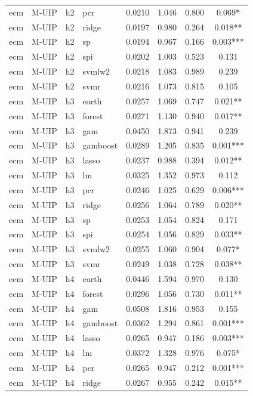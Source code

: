 \begin{ThreePartTable}
\begin{longtable}[t]{llclcccc}
ecm & M-UIP & h2 & pcr & 0.0210 & 1.046 & 0.800 & 0.069*\\
ecm & M-UIP & h2 & ridge & 0.0197 & 0.980 & 0.264 & 0.018**\\
ecm & M-UIP & h2 & sp & 0.0194 & 0.967 & 0.166 & 0.003***\\
ecm & M-UIP & h2 & spi & 0.0202 & 1.003 & 0.523 & 0.131\\
ecm & M-UIP & h2 & svmlw2 & 0.0218 & 1.083 & 0.989 & 0.239\\
ecm & M-UIP & h2 & svmr & 0.0216 & 1.073 & 0.815 & 0.105\\
\addlinespace
ecm & M-UIP & h3 & earth & 0.0257 & 1.069 & 0.747 & 0.021**\\
ecm & M-UIP & h3 & forest & 0.0271 & 1.130 & 0.940 & 0.017**\\
ecm & M-UIP & h3 & gam & 0.0450 & 1.873 & 0.941 & 0.239\\
ecm & M-UIP & h3 & gamboost & 0.0289 & 1.205 & 0.835 & 0.001***\\
ecm & M-UIP & h3 & lasso & 0.0237 & 0.988 & 0.394 & 0.012**\\
ecm & M-UIP & h3 & lm & 0.0325 & 1.352 & 0.973 & 0.112\\
ecm & M-UIP & h3 & pcr & 0.0246 & 1.025 & 0.629 & 0.006***\\
ecm & M-UIP & h3 & ridge & 0.0256 & 1.064 & 0.789 & 0.020**\\
ecm & M-UIP & h3 & sp & 0.0253 & 1.054 & 0.824 & 0.171\\
ecm & M-UIP & h3 & spi & 0.0254 & 1.056 & 0.829 & 0.033**\\
ecm & M-UIP & h3 & svmlw2 & 0.0255 & 1.060 & 0.904 & 0.077*\\
ecm & M-UIP & h3 & svmr & 0.0249 & 1.038 & 0.728 & 0.038**\\
\addlinespace
ecm & M-UIP & h4 & earth & 0.0446 & 1.594 & 0.970 & 0.130\\
ecm & M-UIP & h4 & forest & 0.0296 & 1.056 & 0.730 & 0.011**\\
ecm & M-UIP & h4 & gam & 0.0508 & 1.816 & 0.953 & 0.155\\
ecm & M-UIP & h4 & gamboost & 0.0362 & 1.294 & 0.861 & 0.001***\\
ecm & M-UIP & h4 & lasso & 0.0265 & 0.947 & 0.186 & 0.003***\\
ecm & M-UIP & h4 & lm & 0.0372 & 1.328 & 0.976 & 0.075*\\
ecm & M-UIP & h4 & pcr & 0.0265 & 0.947 & 0.212 & 0.001***\\
ecm & M-UIP & h4 & ridge & 0.0267 & 0.955 & 0.242 & 0.015**\\

\end{longtable}
\end{ThreePartTable}
